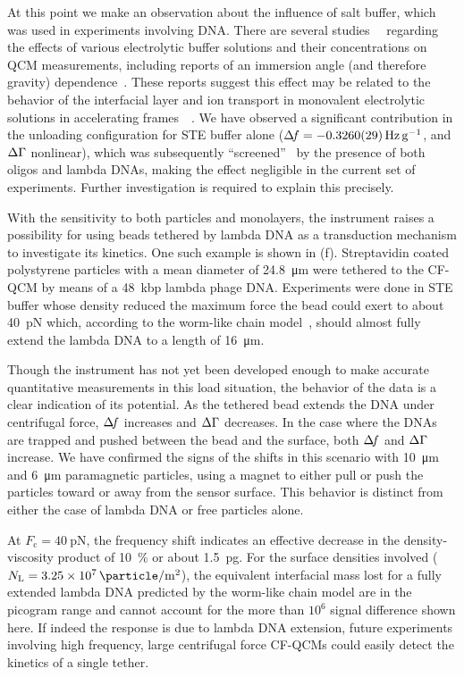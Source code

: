 At this point we make an observation about the influence of salt buffer,
which was used in experiments involving DNA.  There are several
studies~\cite{encarnaccao2007influence}~\cite{lin1995role} regarding the
effects of various electrolytic buffer solutions and their concentrations
on QCM measurements, including reports of an immersion angle (and therefore
gravity) dependence~\cite{yoshimoto2006characteristics}.  These reports
suggest this effect may be related to the behavior of the interfacial layer
and ion transport in monovalent electrolytic solutions in accelerating
frames~\cite{tolman1911electromotive}~\cite{des1893unpolarisirbare}.  We
have observed a significant contribution in the unloading configuration for
STE buffer alone ($\df=\SI{-0.326+-0.0029}{\hertz\per\g}$, and $\Delta\Gamma$
nonlinear), which was subsequently ``screened''~\cite{zhang2002insulating}
by the presence of both oligos and lambda DNAs, making the effect
negligible in the current set of experiments.  Further investigation is
required to explain this precisely.

With the sensitivity to both particles and monolayers, the instrument
raises a possibility for using beads tethered by lambda DNA as a
transduction mechanism to investigate its kinetics.  One such example is
shown in (f).  Streptavidin coated polystyrene
particles with a mean diameter of \SI{24.8}{\micro\meter} were tethered to
the CF-QCM by means of a \SI{48}{kbp} lambda phage DNA.  Experiments were
done in STE buffer whose density reduced the maximum force the bead could
exert to about \SI{40}{\pico\newton} which, according to the worm-like
chain model~\cite{marko1995stretching}, should almost fully extend the
lambda DNA to a length of \SI{16}{\micro\meter}.

Though the instrument has not yet been developed enough to make accurate
quantitative measurements in this load situation, the behavior of the data
is a clear indication of its potential.  As the tethered bead extends the
DNA under centrifugal force, $\Delta\!f$ increases and $\Delta\Gamma$ decreases.  In the
case where the DNAs are trapped and pushed between the bead and the
surface, both $\Delta\!f$ and $\Delta\Gamma$ increase.  We have confirmed the signs of the
shifts in this scenario with \SI{10}{\micro\meter} and \SI{6}{\micro\meter}
paramagnetic particles, using a magnet to either pull or push the
particles toward or away from the sensor surface.  This behavior is
distinct from either the case of lambda DNA or free particles alone.

At $F_\mathrm{c}=\SI{40}{\pico\newton}$, the frequency shift indicates an
effective decrease in the density-viscosity product of \SI{10}{\percent} or
about \SI{1.5}{\pico\gram}.  For the surface densities involved
($N_\mathrm{L}=\SI{3.25e7}{\particle\per\meter\squared}$), the equivalent
interfacial mass lost for a fully extended lambda DNA predicted by the
worm-like chain model are in the picogram range and cannot account for the
more than $10^6$ signal difference shown here.  If indeed the response is
due to lambda DNA extension, future experiments involving high frequency,
large centrifugal force CF-QCMs could easily detect the kinetics of a
single tether.

